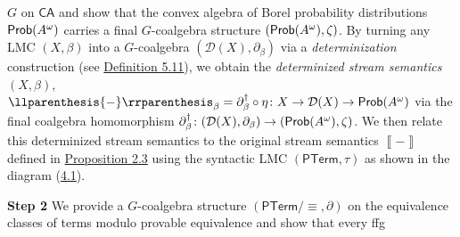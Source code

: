 \hypertarget{html:S4.SS0.SSSx1.p1.m1}{}\({G}\) on %
\hypertarget{html:S4.SS0.SSSx1.p1.m2}{}\({\mathsf{CA}}\) and show that the convex algebra of Borel probability distributions %
\hypertarget{html:S4.SS0.SSSx1.p1.m3}{}\({\text{\sf Prob}(A^{\omega})}\) carries a final %
\hypertarget{html:S4.SS0.SSSx1.p1.m4}{}\({G}\)-coalgebra structure %
\hypertarget{html:S4.SS0.SSSx1.p1.m5}{}\({(\text{\sf Prob}(A^{\omega}),\zeta)}\). By turning any LMC %
\hypertarget{html:S4.SS0.SSSx1.p1.m6}{}\({(X,\beta)}\) into a %
\hypertarget{html:S4.SS0.SSSx1.p1.m7}{}\({G}\)-coalgebra %
\hypertarget{html:S4.SS0.SSSx1.p1.m8}{}\({({\mathcal{D}}(X),\partial_{\beta})}\) via a \emph{determinization} construction (see \hyperlink{html:S5.Thmtheorem11}{Definition 5.11}), we obtain the \emph{determinized stream semantics} %
\hypertarget{html:S4.SS0.SSSx1.p1.m9}{}\({(X,\beta)}\), %
\hypertarget{html:S4.SS0.SSSx1.p1.m10}{}\({\llparenthesis{-}\rrparenthesis_{\beta}=\partial_{\beta}^{\dagger}\circ\eta\colon X\to{\mathcal{D}}(X)\to\text{\sf Prob}(A^{\omega})}\) via the final coalgebra homomorphism %
\hypertarget{html:S4.SS0.SSSx1.p1.m11}{}\({\partial_{\beta}^{\dagger}\colon({\mathcal{D}}(X),\partial_{\beta})\to(\text{\sf Prob}(A^{\omega}),\zeta)}\). We then relate this determinized stream semantics to the original stream semantics %
\hypertarget{html:S4.SS0.SSSx1.p1.m12}{}\({\left\llbracket{-}\right\rrbracket}\) defined in \hyperlink{html:S2.Thmtheorem3}{Proposition 2.3} using the syntactic LMC %
\hypertarget{html:S4.SS0.SSSx1.p1.m13}{}\({(\mathsf{PTerm},\tau)}\) as shown in the diagram (\hyperlink{html:S4.E1}{4.1}).
\par\medskip
\hypertarget{html:S4.SS0.SSSx2}{} \par\noindent\textbf{Step 2}\quad  %
\hypertarget{html:S4.SS0.SSSx2.p1}{} We provide a %
\hypertarget{html:S4.SS0.SSSx2.p1.m1}{}\({G}\)-coalgebra structure %
\hypertarget{html:S4.SS0.SSSx2.p1.m2}{}\({(\mathsf{PTerm}/{\equiv},\partial)}\) on the equivalence classes of terms modulo provable equivalence and show that every ffg %

